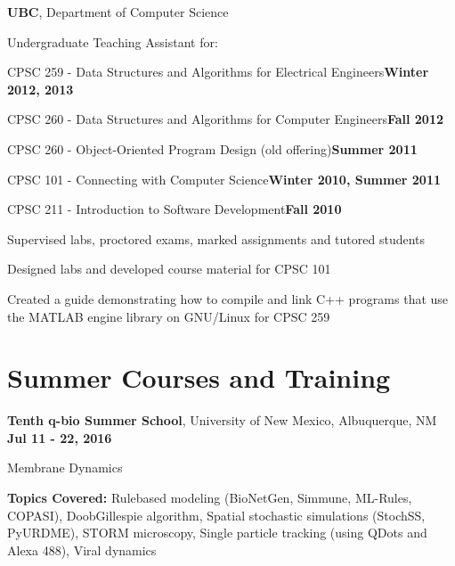\documentclass[margin,line]{res}
\newenvironment{list1}{
  \begin{list}{\ding{113}}{
      \setlength{\itemsep}{0in}
      \setlength{\parsep}{0in} \setlength{\parskip}{0in}
      \setlength{\topsep}{0in} \setlength{\partopsep}{0in} 
      \setlength{\leftmargin}{0.17in}}}{\end{list}}
\newenvironment{list3}{
  \begin{list}{\textopenbullet}{
      \setlength{\itemsep}{0in}
      \setlength{\parsep}{0in} \setlength{\parskip}{0in}
      \setlength{\topsep}{0in} \setlength{\partopsep}{0in} 
      \setlength{\leftmargin}{0.1in}}}{\end{list}}
\begin{document}
\begin{resume}
{\bf  UBC}, Department of Computer Science\\
\vspace*{-.2cm}
\begin{list1}
\setlength\itemsep{0.25em}
\item[] Undergraduate Teaching Assistant for:\\[-0.1cm]
\item[] CPSC 259 - Data Structures and Algorithms for Electrical Engineers\hfill{\bf Winter 2012, 2013}
\item[] CPSC 260 - Data Structures and Algorithms for Computer Engineers\hfill{\bf Fall 2012}
\item[] CPSC 260 - Object-Oriented Program Design (old offering)\hfill{\bf Summer 2011}
\item[] CPSC 101 - Connecting with Computer Science\hfill{\bf Winter 2010, Summer 2011}
\item[] CPSC 211 - Introduction to Software Development\hfill{\bf Fall 2010}\\
\begin{list3}
\vspace*{-.1cm}
\setlength\itemsep{0.25em}
\item Supervised labs, proctored exams, marked assignments and tutored students
\item Designed labs and developed course material for CPSC 101
\item Created a guide demonstrating how to compile and link C++ programs that use the MATLAB engine library on GNU/Linux for CPSC 259
\end{list3}
\end{list1}

\vspace*{.4cm}

\section{\sc Summer Courses and Training}

{\bf Tenth q-bio Summer School}, University of New Mexico, Albuquerque, NM  \hfill {\bf Jul 11 - 22, 2016}\\
\vspace*{-.2cm}
\begin{list1}
\item[] Membrane Dynamics
\vspace*{0.2cm}
\item[] {\bf Topics Covered:} Rule{\textendash}based modeling (BioNetGen, Simmune, ML-Rules, COPASI), Doob{\textendash}Gillespie algorithm, Spatial stochastic simulations (StochSS, PyURDME), STORM microscopy, Single particle tracking (using Q{\textendash}Dots and Alexa 488), Viral dynamics
\end{list1}


\end{resume}
\end{document}
